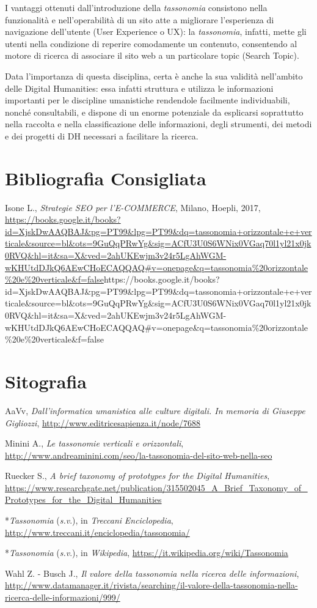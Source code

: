 I vantaggi ottenuti dall'introduzione della \emph{tassonomia} consistono
nella funzionalità e nell'operabilità di un sito atte a migliorare
l'esperienza di navigazione dell'utente (User Experience o UX): la
\emph{tassonomia}, infatti, mette gli utenti nella condizione di
reperire comodamente un contenuto, consentendo al motore di ricerca di
associare il sito web a un particolare topic (Search Topic).

Data l'importanza di questa disciplina, certa è anche la sua validità
nell'ambito delle Digital Humanities: essa infatti struttura e utilizza
le informazioni importanti per le discipline umanistiche rendendole
facilmente individuabili, nonché consultabili, e dispone di un enorme
potenziale da esplicarsi soprattutto nella raccolta e nella
classificazione delle informazioni, degli strumenti, dei metodi e dei
progetti di DH necessari a facilitare la ricerca.

\section*{Bibliografia Consigliata}
{\parindent0pt 
Isone L., \emph{Strategie SEO per l'E-COMMERCE}, Milano, Hoepli, 2017,
\url{https://books.google.it/books?id=XjskDwAAQBAJ\&pg=PT99\&lpg=PT99\&dq=tassonomia+orizzontale+e+verticale\&source=bl\&ots=9GuQqPRwYg\&sig=ACfU3U0S6WNix0VGaq70l1yl21x0jk0RVQ\&hl=it\&sa=X\&ved=2ahUKEwjm3v24r5LgAhWGM-wKHUtdDJkQ6AEwCHoECAQQAQ\#v=onepage\&q=tassonomia\%20orizzontale\%20e\%20verticale\&f=false}{https://books.google.it/books?id=XjskDwAAQBAJ\&pg=PT99\&lpg=PT99\&dq=tassonomia+orizzontale+e+verticale\&source=bl\&ots=9GuQqPRwYg\&sig=ACfU3U0S6WNix0VGaq70l1yl21x0jk0RVQ\&hl=it\&sa=X\&ved=2ahUKEwjm3v24r5LgAhWGM-wKHUtdDJkQ6AEwCHoECAQQAQ\#v=onepage\&q=tassonomia\%20orizzontale\%20e\%20verticale\&f=false}
}

\section*{Sitografia}
{\parindent0pt 
AaVv, \emph{Dall'informatica umanistica alle culture digitali. In
memoria di Giuseppe Gigliozzi},
\url{http://www.editricesapienza.it/node/7688}

Minini A., \emph{Le tassonomie verticali e orizzontali},
\url{http://www.andreaminini.com/seo/la-tassonomia-del-sito-web-nella-seo}

Ruecker S., \emph{A brief taxonomy of prototypes for the Digital
Humanities},
\url{https://www.researchgate.net/publication/315502045_A_Brief_Taxonomy_of_Prototypes_for_the_Digital_Humanities}

*\emph{Tassonomia} (\emph{s.v}.), in \emph{Treccani}
\emph{Enciclopedia},
\url{http://www.treccani.it/enciclopedia/tassonomia/}

*\emph{Tassonomia} (\emph{s.v}.), in \emph{Wikipedia},
\url{https://it.wikipedia.org/wiki/Tassonomia}

Wahl Z. - Busch J., \emph{Il valore della tassonomia nella ricerca delle
informazioni},
\url{http://www.datamanager.it/rivista/searching/il-valore-della-tassonomia-nella-ricerca-delle-informazioni/999/}
}

